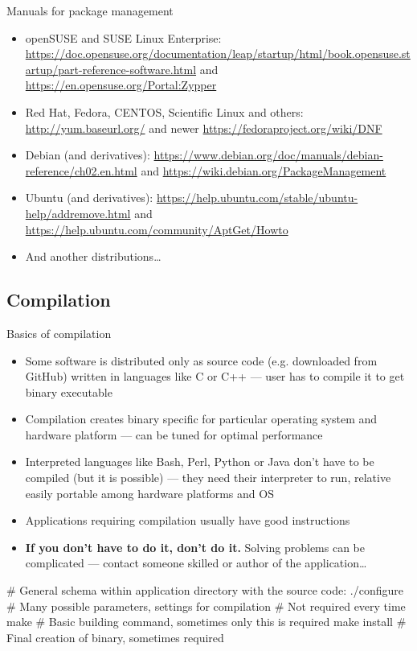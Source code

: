 \documentclass[compress, ucs, xelatex, 11pt, xcolor=svgnames, aspectratio=169,
	hyperref={
		bookmarks=true,
		unicode=true,
		colorlinks=true,
		pdftitle={Linux, command line and MetaCentrum},
		plainpages=false,
		pdfauthor={Vojtech Zeisek},
		pdfsubject={Course about use of Linux command line, writing shell scripts and using MetaCentrum of CESNET},
		pdfcreator={XeLaTeX},
		pdfkeywords={Linux, GNU, BASH, shell, command line, MetaCentrum},
		linkcolor=DarkRed, %
		anchorcolor=DarkBlue, %
		citecolor=Indigo, %
		filecolor=NavyBlue, %
		menucolor=DarkMagenta, %
		urlcolor=DarkBlue, %
		pdftex},
	url={hyphens, lowtilde} %
	]{beamer}
\begin{document}
\begin{frame}{Manuals for package management}
	\begin{itemize}
		\item openSUSE and SUSE Linux Enterprise: \url{https://doc.opensuse.org/documentation/leap/startup/html/book.opensuse.startup/part-reference-software.html} and \url{https://en.opensuse.org/Portal:Zypper}
		\item Red Hat, Fedora, CENTOS, Scientific Linux and others: \url{http://yum.baseurl.org/} and newer \url{https://fedoraproject.org/wiki/DNF}
		\item Debian (and derivatives): \url{https://www.debian.org/doc/manuals/debian-reference/ch02.en.html} and \url{https://wiki.debian.org/PackageManagement}
		\item Ubuntu (and derivatives): \url{https://help.ubuntu.com/stable/ubuntu-help/addremove.html} and \url{https://help.ubuntu.com/community/AptGet/Howto}
		\item And another distributions\ldots
	\end{itemize}
\end{frame}

\subsection{Compilation}

\begin{frame}[fragile]{Basics of compilation}
	\begin{itemize}
		\item Some software is distributed only as source code (e.g. downloaded from GitHub) written in languages like C or C++ --- user has to compile it to get binary executable
		\item Compilation creates binary specific for particular operating system and hardware platform --- can be tuned for optimal performance
		\item Interpreted languages like Bash, Perl, Python or Java don't have to be compiled (but it is possible) --- they need their interpreter to run, relative easily portable among hardware platforms and OS
		\item Applications requiring compilation usually have good instructions
		\item \textbf{If you don't have to do it, don't do it.}\textbf{} Solving problems can be complicated --- contact someone skilled or author of the application\ldots
	\end{itemize}
	\begin{bashcode}
    # General schema within application directory with the source code:
    ./configure # Many possible parameters, settings for compilation
                # Not required every time
    make # Basic building command, sometimes only this is required
    make install # Final creation of binary, sometimes required
	\end{bashcode}
\end{frame}
\end{document}
